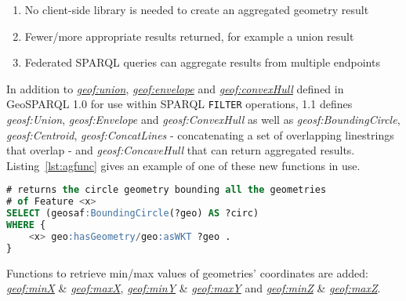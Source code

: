 \documentclass[runningheads]{llncs}
\begin{document}
\begin{enumerate}
    \item No client-side library is needed to create an aggregated geometry result
    \item Fewer/more appropriate results returned, for example a union result
    \item Federated SPARQL queries can aggregate results from multiple endpoints
\end{enumerate}

In addition to \href{http://www.opengis.net/def/function/geosparql/union}{\emph{geof:union}}, \href{http://www.opengis.net/def/function/geosparql/envelope}{\emph{geof:envelope}} and \href{http://www.opengis.net/def/function/geosparql/convexHull}{\emph{geof:convexHull}} defined in GeoSPARQL 1.0 
for use within SPARQL \texttt{FILTER} operations, 1.1 defines \emph{geosf:Union}, \emph{geosf:Envelope} and \emph{geosf:ConvexHull}
as well as \emph{geosf:BoundingCircle}, \emph{geosf:Centroid}, \emph{geosf:ConcatLines} - concatenating a set of overlapping linestrings 
that overlap - and \emph{geosf:ConcaveHull} that can return aggregated results. Listing~\ref{lst:agfunc} gives an example 
of one of these new functions in use.
\small
\begin{lstlisting}[caption=Aggregation Function example SPARQL query,label=lst:agfunc,language=sql,frame=single,basicstyle=\ttfamily,showstringspaces=false]
# returns the circle geometry bounding all the geometries 
# of Feature <x>
SELECT (geosaf:BoundingCircle(?geo) AS ?circ)
WHERE {
    <x> geo:hasGeometry/geo:asWKT ?geo .
}
\end{lstlisting}
\normalsize

Functions to retrieve min/max values of geometries' coordinates are added: \href{http://www.opengis.net/def/function/geosparql/minX}{\emph{geof:minX}} \& \href{http://www.opengis.net/def/function/geosparql/maxX}{\emph{geof:maxX}},
\href{http://www.opengis.net/def/function/geosparql/minY}{\emph{geof:minY}} \& \href{http://www.opengis.net/def/function/geosparql/maxY}{\emph{geof:maxY}} and \href{http://www.opengis.net/def/function/geosparql/minZ}{\emph{geof:minZ}} \& \href{http://www.opengis.net/def/function/geosparql/maxZ}{\emph{geof:maxZ}}.
\end{document}
